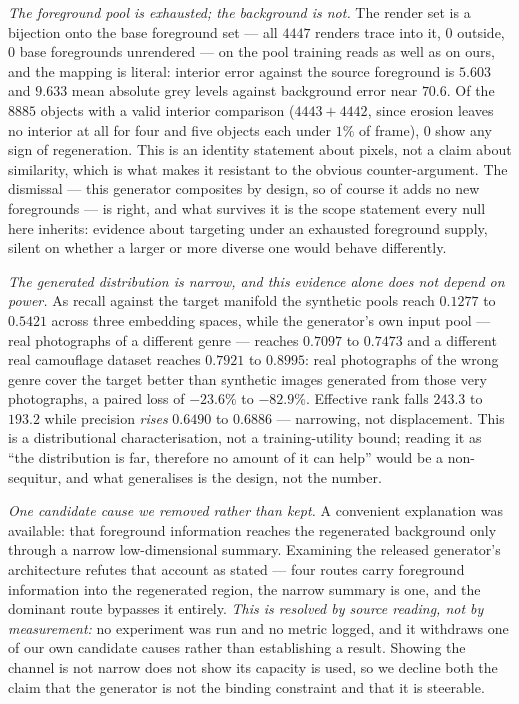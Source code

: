 \documentclass{article} %
\begin{document}
\emph{The foreground pool is exhausted; the background is not.} The render set is a bijection onto the
base foreground set --- all $4447$ renders trace into it, $0$ outside, $0$ base foregrounds unrendered
--- on the pool training reads as well as on ours, and the mapping is literal: interior error against
the source foreground is $5.603$ and $9.633$ mean absolute grey levels against background error near
$70.6$. Of the $8885$ objects with a valid interior comparison ($4443+4442$, since erosion leaves no
interior at all for four and five objects each under $1\%$ of frame), $0$ show any sign of
regeneration. This is an identity statement
about pixels, not a claim about similarity, which is what makes it resistant to the obvious
counter-argument. The dismissal --- this generator composites by design, so of course it adds no new
foregrounds --- is right, and what survives it is the scope statement every null here inherits:
evidence about targeting under an exhausted foreground supply, silent on whether a larger or more
diverse one would behave differently.

\emph{The generated distribution is narrow, and this evidence alone does not depend on power.} As
recall against the target manifold the synthetic pools reach $0.1277$ to $0.5421$ across three
embedding spaces, while the generator's own input pool --- real photographs of a different genre ---
reaches $0.7097$ to $0.7473$ and a different real camouflage dataset reaches $0.7921$ to $0.8995$: real
photographs of the wrong genre cover the target better than synthetic images generated from those very
photographs, a paired loss of $-23.6\%$ to $-82.9\%$. Effective rank falls $243.3$ to $193.2$ while
precision \emph{rises} $0.6490$ to $0.6886$ --- narrowing, not displacement. This is a distributional
characterisation, not a training-utility bound; reading it as ``the distribution is far, therefore no
amount of it can help'' would be a non-sequitur, and what generalises is the design, not the number.

\emph{One candidate cause we removed rather than kept.} A convenient explanation was available: that
foreground information reaches the regenerated background only through a narrow low-dimensional
summary. Examining the released generator's architecture refutes that account as stated --- four routes
carry foreground information into the regenerated region, the narrow summary is one, and the dominant
route bypasses it entirely. \emph{This is resolved by source reading, not by measurement:} no
experiment was run and no metric logged, and it withdraws one of our own candidate causes rather than
establishing a result. Showing the channel is not narrow does not show its capacity is used, so we
decline both the claim that the generator is not the binding constraint and that it is steerable.
\end{document}
